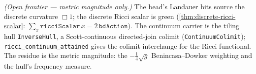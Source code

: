 \begin{theorem}\label{thm:infobead-ricci}\notready{}
\emph{(Open frontier --- metric magnitude only.)} The bead's Landauer bits source
the discrete curvature $\Box 1$; the discrete Ricci scalar is green
(\cref{thm:discrete-ricci-scalar}: $\sum_x\mathtt{ricciScalar}\,x =
2\,\mathtt{bdAction}$).  The continuum carrier is the tiling hull
\texttt{InverseHull}, a Scott-continuous directed-join colimit
(\texttt{ContinuumColimit}); \texttt{ricci\_continuum\_attained} gives the
colimit interchange for the Ricci functional.  The residue is the metric
magnitude: the $-\tfrac14\sqrt g$ Benincasa--Dowker weighting and the hull's
frequency measure.
\end{theorem}
